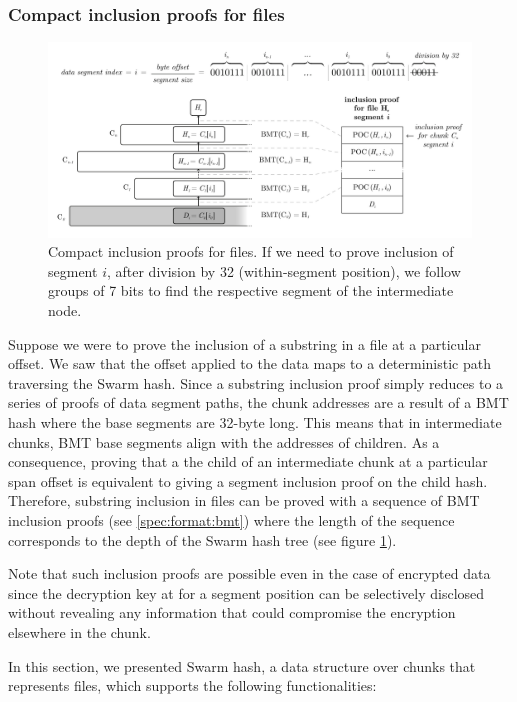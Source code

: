 \subsubsection{Compact inclusion proofs for files}


\begin{figure}[htbp]
\centering
\includegraphics[width=\textwidth]{fig/file-inclusion.pdf}
\caption[Compact inclusion proofs for files \statusgreen]{Compact inclusion proofs for files. If we need to prove inclusion of segment   $i$, after division by 32 (within-segment position), we follow groups of 7 bits to find the respective segment of the intermediate node.}
\label{fig:file-inclusion}
\end{figure}


Suppose we were to prove the inclusion of a substring in a file at a particular offset. We saw that the offset applied to the data maps to a deterministic path traversing the Swarm hash. Since a substring inclusion proof simply reduces to a series of proofs of data segment paths, the chunk addresses are a result of a BMT hash where the base segments are 32-byte long. This means that in intermediate chunks, BMT base segments align with the addresses of children. As a consequence, proving that a the child of an intermediate chunk at a particular span offset is equivalent to giving a segment inclusion proof on the child hash. Therefore, substring inclusion in files can be proved with a sequence of BMT inclusion proofs (see \ref{spec:format:bmt}) where the length of the sequence corresponds to the depth of the Swarm hash tree (see figure \ref{fig:file-inclusion}). 


Note that such inclusion proofs are possible even in the case of encrypted data since the decryption key at for a segment position can be selectively disclosed without revealing any information that could compromise the encryption elsewhere in the chunk.

In this section, we presented Swarm hash, a data structure over chunks that represents files, which supports the following functionalities:

